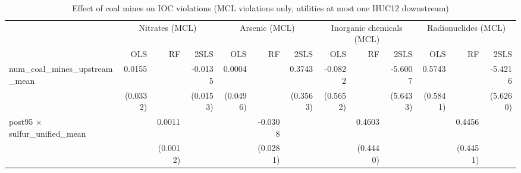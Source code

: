 
\begin{table}[htbp]
   
   \caption{\label{2sls_dwnstrm_minevio_mcl} Effect of coal mines on IOC violations (MCL violations only, utilities at most one HUC12 downstream)}
   \bigskip
   
   \centering
   
   \begin{adjustbox}{width = \textwidth, center}
      
      
      \begin{tabular}{lrrrrrrrrrrrr}
         \toprule
         
          & \multicolumn{3}{c}{Nitrates (MCL)} & \multicolumn{3}{c}{Arsenic (MCL)} & \multicolumn{3}{c}{Inorganic chemicals (MCL)} & \multicolumn{3}{c}{Radionuclides (MCL)}\\
         
                                                                             & OLS                  & RF                    & 2SLS                  & OLS                  & RF                    & 2SLS                  & OLS                  & RF       & 2SLS     & OLS      & RF       & 2SLS\\  
         
         \midrule 
         num\_coal\_mines\_upstream\_mean                                    & 0.0155               &                       & -0.0135               & 0.0004               &                       & 0.3743                & -0.0822              &          & -5.6007  & 0.5743   &          & -5.4216\\   
                                                                             & (0.0332)             &                       & (0.0153)              & (0.0496)             &                       & (0.3563)              & (0.5652)             &          & (5.6433) & (0.5841) &          & (5.6260)\\   
         post95 $\times$ sulfur\_unified\_mean                               &                      & 0.0011                &                       &                      & -0.0308               &                       &                      & 0.4603   &          &          & 0.4456   &   \\   
                                                                             &                      & (0.0012)              &                       &                      & (0.0281)              &                       &                      & (0.4440) &          &          & (0.4451) &   \\   
         

\end{tabular}
\end{adjustbox}
\end{table}

